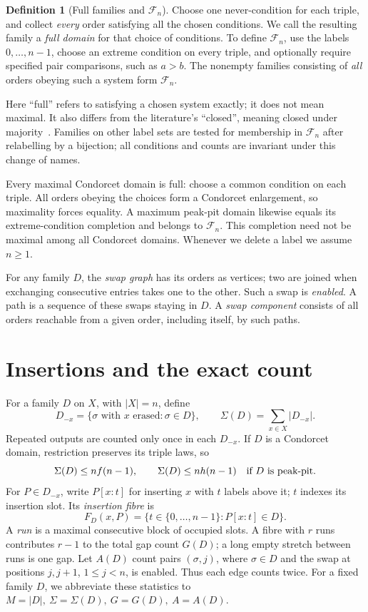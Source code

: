 \documentclass[11pt,letterpaper]{article}
\theoremstyle{definition}
\newtheorem{definition}[theorem]{Definition}
\newcommand{\F}{\mathcal F}
\newcommand{\Sig}{\Sigma}
\begin{document}
\begin{definition}[Full families and \(\F_n\)]\label{def:full}
Choose one never-condition for each triple, and collect \emph{every}
order satisfying all the chosen conditions. We call the resulting
family a \emph{full domain} for that choice of conditions.
To define \(\F_n\), use the labels \(0,\ldots,n-1\), choose an
extreme condition on every triple, and optionally require specified
pair comparisons, such as \(a>b\). The nonempty families consisting
of \emph{all} orders obeying such a system form \(\F_n\).
\end{definition}
Here ``full'' refers to satisfying a chosen system exactly; it does not
mean maximal. It also differs from the literature's ``closed'', meaning
closed under majority~\cite{PuppeSlinko}. Families on other label sets
are tested for membership in \(\F_n\) after relabelling by a bijection;
all conditions and counts are invariant under this change of names.

Every maximal Condorcet domain is full: choose a common condition on
each triple. All orders obeying the choices form a Condorcet enlargement,
so maximality forces equality. A maximum peak-pit domain likewise equals
its extreme-condition completion and belongs to \(\F_n\).
This completion need not be maximal among all Condorcet domains.
Whenever we delete a label we assume \(n\geq1\).

For any family \(D\), the \emph{swap graph} has its orders as vertices;
two are joined when exchanging consecutive entries takes one to the
other. Such a swap is \emph{enabled}. A path is a sequence of these
swaps staying in \(D\). A \emph{swap component} consists of all orders
reachable from a given order, including itself, by such paths.

\clearpage
\section{Insertions and the exact count}\label{sec:fibres}
For a family \(D\) on \(X\), with \(|X|=n\), define
\[
 D_{-x}=\{\sigma\text{ with }x\text{ erased}:\sigma\in D\},
 \qquad\Sig(D)=\sum_{x\in X}|D_{-x}|.
\]
Repeated outputs are counted only once in each \(D_{-x}\).
If \(D\) is a Condorcet domain, restriction preserves its triple laws, so
\begin{equation}\label{eq:deleteupper}
 \Sig(D)\leq nf(n-1),\qquad
 \Sig(D)\leq nh(n-1)\quad\hbox{if \(D\) is peak-pit}.
\end{equation}
For \(P\in D_{-x}\), write \(P[x:t]\) for inserting \(x\) with
\(t\) labels above it; \(t\) indexes its insertion slot. Its \emph{insertion fibre} is
\[
 F_D(x,P)=\{t\in\{0,\ldots,n-1\}:P[x:t]\in D\}.
\]
A \emph{run} is a maximal consecutive block of occupied slots.
A fibre with \(r\) runs contributes \(r-1\) to the total gap count
\(G(D)\); a long empty stretch between runs is one gap.
Let \(A(D)\) count pairs \((\sigma,j)\), where \(\sigma\in D\) and
the swap at positions \(j,j+1\), \(1\leq j<n\), is enabled.
Thus each edge counts twice. For a fixed family \(D\),
we abbreviate these statistics to
\(M=|D|,\ \Sig=\Sig(D),\ G=G(D),\ A=A(D)\).
\end{document}
